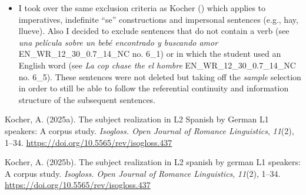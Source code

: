 \documentclass[
  letterpaper,
  DIV=11,
  numbers=noendperiod]{scrartcl}
\newlength{\cslhangindent}
\newenvironment{CSLReferences}[2] %
 {\begin{list}{}{%
  \setlength{\itemindent}{0pt}
  \setlength{\leftmargin}{0pt}
  \setlength{\parsep}{0pt}
  \ifodd #1
   \setlength{\leftmargin}{\cslhangindent}
   \setlength{\itemindent}{-1\cslhangindent}
  \fi
  \setlength{\itemsep}{#2\baselineskip}}}
 {\end{list}}
\begin{document}
\begin{itemize}
  (DE\_WR\_31\_27\_24\_14\_MS no. 19\_2), in
  joined\_germanL1\_data\_annotation (\emph{Nunca aprendì espanol}
  DE\_WR\_20\_50\_2\_14\_HO no. 4\_2).
\item
  I took over the same exclusion criteria as Kocher
  () which applies to
  imperatives, indefinite ``se'' constructions and impersonal sentences
  (e.g., hay, llueve). Also I decided to exclude sentences that do not
  contain a verb (see \emph{una película sobre un bebé encontrado y
  buscando amor} EN\_WR\_12\_30\_0.7\_14\_NC no. 6\_1) or in which the
  student used an English word (see \emph{La cop chase the el hombre}
  EN\_WR\_12\_30\_0.7\_14\_NC no. 6\_5). These sentences were not
  deleted but taking off the \emph{sample} selection in order to still
  be able to follow the referential continuity and information structure
  of the subsequent sentences.
\end{itemize}

\protect{}\label{refs}
\begin{CSLReferences}{1}{0}
Kocher, A. (2025a). The subject realization in {L2} {Spanish} by
{German} {L1} speakers: {A} corpus study. \emph{Isogloss. Open Journal
of Romance Linguistics}, \emph{11}(2), 1--34.
\url{https://doi.org/10.5565/rev/isogloss.437}

Kocher, A. (2025b). The subject realization in L2 spanish by german L1
speakers: A corpus study. \emph{Isogloss. Open Journal of Romance
Linguistics}, \emph{11}(2), 1--34.
\url{https://doi.org/10.5565/rev/isogloss.437}

\end{CSLReferences}
\end{document}
